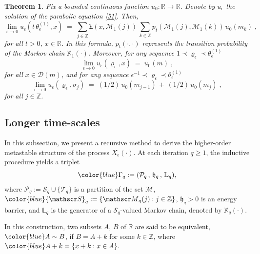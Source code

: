 \documentclass[reqno]{amsart}
\theoremstyle{plain}
\newtheorem{theorem}{Theorem}[section]
\theoremstyle{definition}
\newcommand{\mc}[1]{{\mathcal #1}}
\newcommand{\mf}[1]{{\mathfrak #1}}
\newcommand{\bb}[1]{{\mathbb #1}}
\newcommand{\ms}[1]{{\mathscr #1}}
\newcommand{\mtt}[1]{{\mathtt #1}}
\newcounter{as}[section]
\newcommand{\<}{\langle}
\renewcommand{\>}{\rangle}
\begin{document}
\begin{theorem}
\label{mt1}
Fix a bounded continuous function $u_0\colon \bb R \to \bb R$.  Denote
by $u_\epsilon$ the solution of the parabolic equation
\eqref{51}. Then,
\begin{equation*}
\lim_{\epsilon\to 0} u_{\epsilon}(t\,\theta_{\epsilon}^{(1)},x)
\;=\; \sum_{j\in \bb Z} \mtt h(x, \ms M_1(j))\, \sum_{k\in \bb Z}
p_{t}(\ms M_1(j), \ms M_1(k))\,u_{0}(m_k)\;,
\end{equation*}
for all $t>0$, $x\in \bb R$. In this formula,
$p_t(\cdot, \cdot)$ represents the transition probability of the
Markov chain $\bb X_1(\cdot)$.  Moreover, for any sequence
$1 \prec \varrho_{\epsilon}\prec\theta_{\epsilon}^{(1)}$
\begin{equation*}
\lim_{\epsilon\to0}u_{\epsilon}(\varrho_{\epsilon}, x)
\;=\;u_{0}(m) \;,
\end{equation*}
for all $x\in\mathcal{D}(m)$, and for any sequence
$\epsilon^{-1} \prec \varrho_{\epsilon}\prec\theta_{\epsilon}^{(1)}$
\begin{equation*}
\lim_{\epsilon\to0}u_{\epsilon}(\varrho_{\epsilon}, \sigma_j)
\;=\; (1/2) \, u_{0}(m_{j-1}) \,+\, (1/2) \, u_{0}(m_j) \;,
\end{equation*}
for all $j\in \bb Z$.

\end{theorem}

\subsection*{Longer time-scales}

In this subsection, we present a recursive method to derive the
higher-order metastable structure of the process $X_\epsilon(\cdot)$.
At each iteration $q\geq 1$, the inductive procedure yields a triplet
\begin{equation}
\label{meta_trip}
{\color{blue}
\Gamma_{q}:= (\mc P_{q} \,,\, \mf h_{q} \,,\, \bb L_q)},   
\end{equation}
where $\mc P_{q} := \ms S_q \cup \{ \ms T_q\}$ is a partition of the
set $\mc M$,
${\color{blue} \ms S_q} := \{ \ms M_{q}(j) : j\in \bb Z\}$,
$\mf h_q>0$ is an energy barrier, and $\bb L_q$ is the generator of a
$\ms S_q$-valued Markov chain, denoted by $\bb X_q(\cdot)$.

In this construction, two subsets $A$, $B$ of $\bb R$ are said to be
equivalent, $\color{blue} A\sim B$, if $B=A+k$ for some $k\in \bb Z$,
where $\color{blue} A+k = \{x+k : x\in A\}$.
\end{document}
